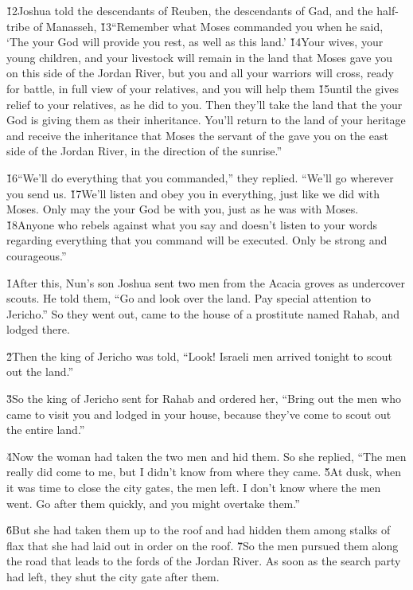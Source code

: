 \v{12}Joshua told the descendants of Reuben, the descendants of Gad, and the half-tribe of Manasseh, \v{13}``Remember what Moses commanded you when he said, `The  your God will provide you rest, as well as this land.' \v{14}Your wives, your young children, and your livestock will remain in the land that Moses gave you on this side of the Jordan River, but you and all your warriors will cross, ready for battle, in full view of your relatives, and you will help them \v{15}until the  gives relief to your relatives, as he did to you. Then they'll take the land that the  your God is giving them as their inheritance. You'll return to the land of your heritage and receive the inheritance that Moses the servant of the  gave you on the east side of the Jordan River, in the direction of the sunrise.''

\v{16}``We'll do everything that you commanded,'' they replied. ``We'll go wherever you send us. \v{17}We'll listen and obey you in everything, just like we did with Moses. Only may the  your God be with you, just as he was with Moses. \v{18}Anyone who rebels against what you say and doesn't listen to your words regarding everything that you command will be executed. Only be strong and courageous.''

\v{1}After this, Nun's son Joshua sent two men from the Acacia groves as undercover scouts. He told them, ``Go and look over the land. Pay special attention to Jericho.'' So they went out, came to the house of a prostitute named Rahab, and lodged there.

\v{2}Then the king of Jericho was told, ``Look! Israeli men arrived tonight to scout out the land.''

\v{3}So the king of Jericho sent for Rahab and ordered her, ``Bring out the men who came to visit you and lodged in your house, because they've come to scout out the entire land.''

\v{4}Now the woman had taken the two men and hid them. So she replied, ``The men really did come to me, but I didn't know from where they came. \v{5}At dusk, when it was time to close the city gates, the men left. I don't know where the men went. Go after them quickly, and you might overtake them.''

\v{6}But she had taken them up to the roof and had hidden them among stalks of flax that she had laid out in order on the roof. \v{7}So the men pursued them along the road that leads to the fords of the Jordan River. As soon as the search party had left, they shut the city gate after them.

